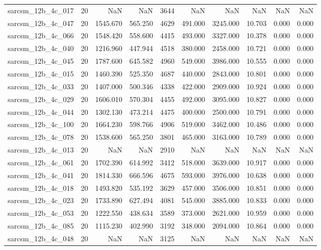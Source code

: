 \begin{tabular}{lrrrrrrrrr}
sarcsm\_12b\_4c\_017 & 20 & NaN & NaN & 3644 & NaN & NaN & NaN & NaN & NaN \\
sarcsm\_12b\_4c\_047 & 20 & 1545.670 & 565.250 & 4629 & 491.000 & 3245.000 & 10.703 & 0.000 & 0.000 \\
sarcsm\_12b\_4c\_066 & 20 & 1548.420 & 558.600 & 4415 & 493.000 & 3327.000 & 10.378 & 0.000 & 0.000 \\
sarcsm\_12b\_4c\_040 & 20 & 1216.960 & 447.944 & 4518 & 380.000 & 2458.000 & 10.721 & 0.000 & 0.000 \\
sarcsm\_12b\_4c\_045 & 20 & 1787.600 & 645.582 & 4960 & 549.000 & 3986.000 & 10.555 & 0.000 & 0.000 \\
sarcsm\_12b\_4c\_015 & 20 & 1460.390 & 525.350 & 4687 & 440.000 & 2843.000 & 10.801 & 0.000 & 0.000 \\
sarcsm\_12b\_4c\_033 & 20 & 1407.000 & 500.346 & 4338 & 422.000 & 2909.000 & 10.924 & 0.000 & 0.000 \\
sarcsm\_12b\_4c\_029 & 20 & 1606.010 & 570.304 & 4455 & 492.000 & 3095.000 & 10.827 & 0.000 & 0.000 \\
sarcsm\_12b\_4c\_044 & 20 & 1302.130 & 473.214 & 4475 & 400.000 & 2500.000 & 10.791 & 0.000 & 0.000 \\
sarcsm\_12b\_4c\_100 & 20 & 1664.230 & 598.766 & 4906 & 519.000 & 3462.000 & 10.486 & 0.000 & 0.000 \\
sarcsm\_12b\_4c\_078 & 20 & 1538.600 & 565.250 & 3801 & 465.000 & 3163.000 & 10.789 & 0.000 & 0.000 \\
sarcsm\_12b\_4c\_013 & 20 & NaN & NaN & 2910 & NaN & NaN & NaN & NaN & NaN \\
sarcsm\_12b\_4c\_061 & 20 & 1702.390 & 614.992 & 3412 & 518.000 & 3639.000 & 10.917 & 0.000 & 0.000 \\
sarcsm\_12b\_4c\_041 & 20 & 1814.330 & 666.596 & 4675 & 593.000 & 3976.000 & 10.638 & 0.000 & 0.000 \\
sarcsm\_12b\_4c\_018 & 20 & 1493.820 & 535.192 & 3629 & 457.000 & 3506.000 & 10.851 & 0.000 & 0.000 \\
sarcsm\_12b\_4c\_023 & 20 & 1733.890 & 627.494 & 4081 & 545.000 & 3885.000 & 10.833 & 0.000 & 0.000 \\
sarcsm\_12b\_4c\_053 & 20 & 1222.550 & 438.634 & 3589 & 373.000 & 2621.000 & 10.959 & 0.000 & 0.000 \\
sarcsm\_12b\_4c\_085 & 20 & 1115.230 & 402.990 & 3192 & 348.000 & 2094.000 & 10.864 & 0.000 & 0.000 \\
sarcsm\_12b\_4c\_048 & 20 & NaN & NaN & 3125 & NaN & NaN & NaN & NaN & NaN \\

\end{tabular}
